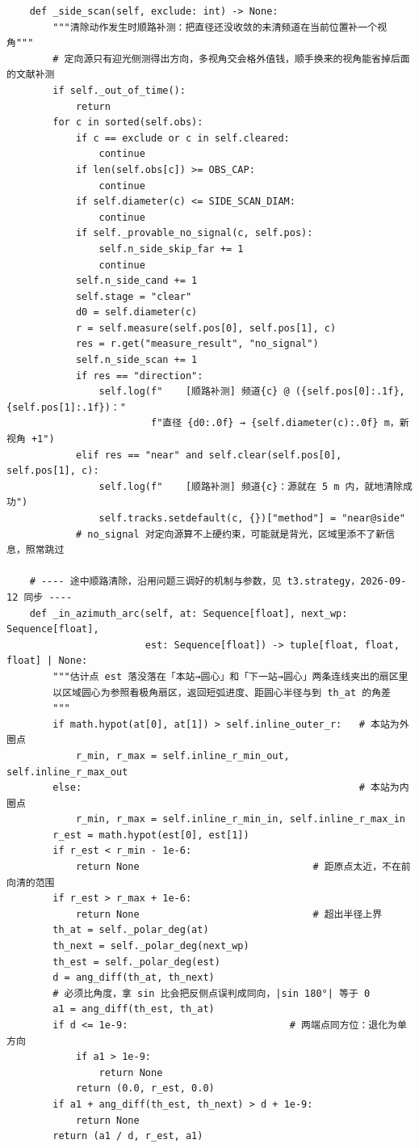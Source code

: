\documentclass[UTF8, zihao=5,AutoFakeBold=2]{ctexart}
\begin{document}
\begin{lstlisting}
    def _side_scan(self, exclude: int) -> None:
        """清除动作发生时顺路补测：把直径还没收敛的未清频道在当前位置补一个视角"""
        # 定向源只有迎光侧测得出方向，多视角交会格外值钱，顺手换来的视角能省掉后面的文献补测
        if self._out_of_time():
            return
        for c in sorted(self.obs):
            if c == exclude or c in self.cleared:
                continue
            if len(self.obs[c]) >= OBS_CAP:
                continue
            if self.diameter(c) <= SIDE_SCAN_DIAM:
                continue
            if self._provable_no_signal(c, self.pos):
                self.n_side_skip_far += 1
                continue
            self.n_side_cand += 1
            self.stage = "clear"
            d0 = self.diameter(c)
            r = self.measure(self.pos[0], self.pos[1], c)
            res = r.get("measure_result", "no_signal")
            self.n_side_scan += 1
            if res == "direction":
                self.log(f"    [顺路补测] 频道{c} @ ({self.pos[0]:.1f}, {self.pos[1]:.1f})："
                         f"直径 {d0:.0f} → {self.diameter(c):.0f} m，新视角 +1")
            elif res == "near" and self.clear(self.pos[0], self.pos[1], c):
                self.log(f"    [顺路补测] 频道{c}：源就在 5 m 内，就地清除成功")
                self.tracks.setdefault(c, {})["method"] = "near@side"
            # no_signal 对定向源算不上硬约束，可能就是背光，区域里添不了新信息，照常跳过

    # ---- 途中顺路清除，沿用问题三调好的机制与参数，见 t3.strategy，2026-09-12 同步 ----
    def _in_azimuth_arc(self, at: Sequence[float], next_wp: Sequence[float],
                        est: Sequence[float]) -> tuple[float, float, float] | None:
        """估计点 est 落没落在「本站→圆心」和「下一站→圆心」两条连线夹出的扇区里
        以区域圆心为参照看极角扇区，返回短弧进度、距圆心半径与到 th_at 的角差
        """
        if math.hypot(at[0], at[1]) > self.inline_outer_r:   # 本站为外圈点
            r_min, r_max = self.inline_r_min_out, self.inline_r_max_out
        else:                                                # 本站为内圈点
            r_min, r_max = self.inline_r_min_in, self.inline_r_max_in
        r_est = math.hypot(est[0], est[1])
        if r_est < r_min - 1e-6:
            return None                              # 距原点太近，不在前向清的范围
        if r_est > r_max + 1e-6:
            return None                              # 超出半径上界
        th_at = self._polar_deg(at)
        th_next = self._polar_deg(next_wp)
        th_est = self._polar_deg(est)
        d = ang_diff(th_at, th_next)
        # 必须比角度，拿 sin 比会把反侧点误判成同向，|sin 180°| 等于 0
        a1 = ang_diff(th_est, th_at)
        if d <= 1e-9:                            # 两端点同方位：退化为单方向
            if a1 > 1e-9:
                return None
            return (0.0, r_est, 0.0)
        if a1 + ang_diff(th_est, th_next) > d + 1e-9:
            return None
        return (a1 / d, r_est, a1)


\end{lstlisting}
\end{document}
